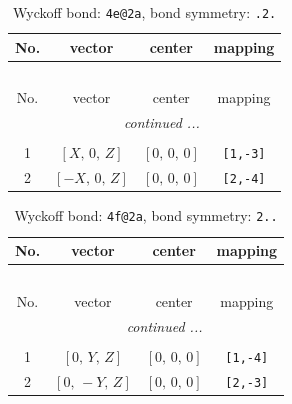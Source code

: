 \documentclass[fleqn,8pt]{jsarticle}
\begin{document}
\begin{longtable}{cccc}
\caption{Wyckoff bond: {\tt 4e@2a}, bond symmetry: {\tt .2.}}
 \\
 \hline \hline
No. & vector & center & mapping \\ \hline \endfirsthead

\multicolumn{3}{l}{\tablename\ \thetable{}} \\
 \hline \hline
No. & vector & center & mapping \\ \hline \endhead

 \hline \hline
\multicolumn{3}{r}{\footnotesize\it continued ...} \\ \endfoot

 \hline \hline
\multicolumn{3}{r}{} \\ \endlastfoot

1 & $\left[ X,\, 0,\, Z \right]$ & $\left[ 0,\, 0,\, 0 \right]$ & {\tt [1,-3]} \\ \hline
2 & $\left[ - X,\, 0,\, Z \right]$ & $\left[ 0,\, 0,\, 0 \right]$ & {\tt [2,-4]} \\
\end{longtable}
\renewcommand{\arraystretch}{1.2}
\begin{longtable}{cccc}
\caption{Wyckoff bond: {\tt 4f@2a}, bond symmetry: {\tt 2..}}
 \\
 \hline \hline
No. & vector & center & mapping \\ \hline \endfirsthead

\multicolumn{3}{l}{\tablename\ \thetable{}} \\
 \hline \hline
No. & vector & center & mapping \\ \hline \endhead

 \hline \hline
\multicolumn{3}{r}{\footnotesize\it continued ...} \\ \endfoot

 \hline \hline
\multicolumn{3}{r}{} \\ \endlastfoot

1 & $\left[ 0,\, Y,\, Z \right]$ & $\left[ 0,\, 0,\, 0 \right]$ & {\tt [1,-4]} \\ \hline
2 & $\left[ 0,\, - Y,\, Z \right]$ & $\left[ 0,\, 0,\, 0 \right]$ & {\tt [2,-3]} \\
\end{longtable}
\renewcommand{\arraystretch}{1.2}
\end{document}
